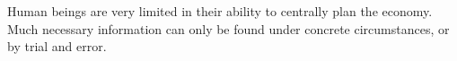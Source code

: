 Human beings are very limited in their ability to centrally plan the economy.
Much necessary information can only be found under concrete circumstances, or by trial and error.